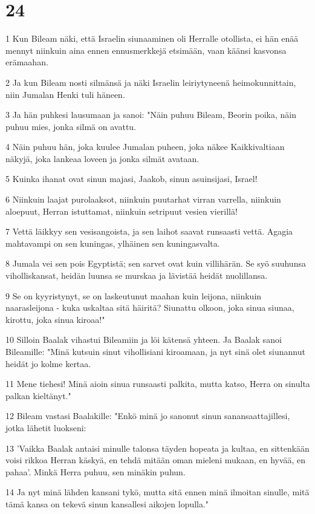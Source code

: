 \chapter{24}

\par 1 Kun Bileam näki, että Israelin siunaaminen oli Herralle otollista, ei hän enää mennyt niinkuin aina ennen ennusmerkkejä etsimään, vaan käänsi kasvonsa erämaahan.
\par 2 Ja kun Bileam nosti silmänsä ja näki Israelin leiriytyneenä heimokunnittain, niin Jumalan Henki tuli häneen.
\par 3 Ja hän puhkesi lausumaan ja sanoi: "Näin puhuu Bileam, Beorin poika, näin puhuu mies, jonka silmä on avattu.
\par 4 Näin puhuu hän, joka kuulee Jumalan puheen, joka näkee Kaikkivaltiaan näkyjä, joka lankeaa loveen ja jonka silmät avataan.
\par 5 Kuinka ihanat ovat sinun majasi, Jaakob, sinun asuinsijasi, Israel!
\par 6 Niinkuin laajat purolaaksot, niinkuin puutarhat virran varrella, niinkuin aloepuut, Herran istuttamat, niinkuin setripuut vesien vierillä!
\par 7 Vettä läikkyy sen vesisangoista, ja sen laihot saavat runsaasti vettä. Agagia mahtavampi on sen kuningas, ylhäinen sen kuningasvalta.
\par 8 Jumala vei sen pois Egyptistä; sen sarvet ovat kuin villihärän. Se syö suuhunsa viholliskansat, heidän luunsa se murskaa ja lävistää heidät nuolillansa.
\par 9 Se on kyyristynyt, se on laskeutunut maahan kuin leijona, niinkuin naarasleijona - kuka uskaltaa sitä häiritä? Siunattu olkoon, joka sinua siunaa, kirottu, joka sinua kiroaa!"
\par 10 Silloin Baalak vihastui Bileamiin ja löi kätensä yhteen. Ja Baalak sanoi Bileamille: "Minä kutsuin sinut vihollisiani kiroamaan, ja nyt sinä olet siunannut heidät jo kolme kertaa.
\par 11 Mene tiehesi! Minä aioin sinua runsaasti palkita, mutta katso, Herra on sinulta palkan kieltänyt."
\par 12 Bileam vastasi Baalakille: "Enkö minä jo sanonut sinun sanansaattajillesi, jotka lähetit luokseni:
\par 13 'Vaikka Baalak antaisi minulle talonsa täyden hopeata ja kultaa, en sittenkään voisi rikkoa Herran käskyä, en tehdä mitään oman mieleni mukaan, en hyvää, en pahaa'. Minkä Herra puhuu, sen minäkin puhun.
\par 14 Ja nyt minä lähden kansani tykö, mutta sitä ennen minä ilmoitan sinulle, mitä tämä kansa on tekevä sinun kansallesi aikojen lopulla."
